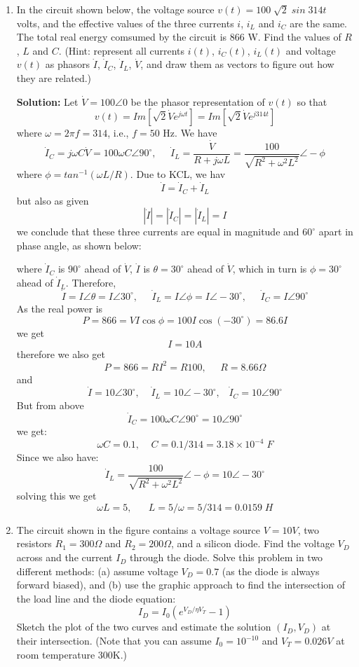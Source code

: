\begin{enumerate}
\item 
In the circuit shown below, the voltage source $v(t)=100\;\sqrt{2}\;sin\;314t\;$ volts,
and the effective values of the three currents $i$, $i_L$ and $i_C$ are the same. The
total real energy comsumed by the circuit is 866 W. Find the values of $R$, $L$ and $C$.
(Hint: represent all currents $i(t)$, $i_C(t)$, $i_L(t)$ and voltage $v(t)$ as phasors 
$\dot{I}$, $\dot{I}_C$, $\dot{I}_L$, $\dot{V}$, and draw them as vectors to figure out
how they are related.)



{\bf Solution:}
Let $\dot{V}=100\angle 0$ be the phasor representation of $v(t)$ so that 
\[ v(t)=Im[\sqrt{2} \dot{V} e^{j\omega t}] =Im[\sqrt{2} \dot{V} e^{j314t}] \]
where $\omega=2\pi f=314$, i.e., $f=50$ Hz. We have
\[ \dot{I}_C=j\omega C \dot{V}=100\omega C \angle 90^\circ,
\;\;\;\;\;\dot{I}_L=\frac{\dot{V}}{R+j\omega L}=\frac{100}{\sqrt{R^2+\omega^2 L^2}}\angle -\phi \]
where $\phi=tan^{-1}(\omega L/R)$. Due to KCL, we hav
\[ \dot{I}=\dot{I}_C+\dot{I}_L \]
but also as given
\[ |\dot{I}|=|\dot{I}_C|=|\dot{I}_L|=I \]
we conclude that these three currents are equal in magnitude and $60^\circ$ apart in 
phase angle, as shown below:

where $\dot{I}_C$ is $90^\circ$ ahead of $\dot{V}$, $\dot{I}$ is $\theta=30^\circ$
ahead of $\dot{V}$, which in turn is $\phi=30^\circ$ ahead of $\dot{I}_L$. Therefore,
\[ \dot{I}=I\angle \theta=I\angle 30^\circ,\;\;\;\;\;\dot{I}_L=I\angle \phi=I\angle -30^\circ,
\;\;\;\;\;\dot{I}_C=I\angle 90^\circ  \]
As the real power is 
\[ P=866=V I \cos\phi =100 I \cos (-30^\circ)=86.6 I \]
we get
\[ I=10 A \]
therefore we also get
\[ P=866=RI^2=R 100,\;\;\;\;\;R=8.66 \Omega \]
and
\[ \dot{I}=10\angle 30^\circ,\;\;\;\;\dot{I}_L=10\angle -30^\circ,\;\;\;\dot{I}_C=10\angle 90^\circ  \]
But from above
\[ \dot{I}_C=100\omega C \angle 90^\circ=10\angle 90^\circ \]
we get:
\[ \omega C=0.1,\;\;\;\;C=0.1/314=3.18\times 10^{-4} \; F\]
Since we also have:
\[ \dot{I}_L=\frac{100}{\sqrt{R^2+\omega^2 L^2}}\angle -\phi=10\angle -30^\circ \]
solving this we get
\[ \omega L=5,\;\;\;\;\;\;L=5/\omega=5/314=0.0159\;H \]


\item The circuit shown in the figure contains a voltage source $V=10V$,
two resistors $R_1=300\Omega$ and $R_2=200\Omega$, and a silicon diode.
Find the voltage $V_D$ across and the current $I_D$ through the diode.
Solve this problem in two different methods: (a) assume voltage $V_D=0.7$ 
(as the diode is always forward biased), and (b) use the graphic approach
to find the intersection of the load line and the diode equation:
\[ I_D=I_0 ( e^{V_D/\eta V_T}-1 ) \]
Sketch the plot of the two curves and estimate the solution $(I_D,V_D)$
at their intersection. (Note that you can assume $I_0=10^{-10}$ and 
$V_T=0.026V$ at room temperature 300K.)


\end{enumerate}
